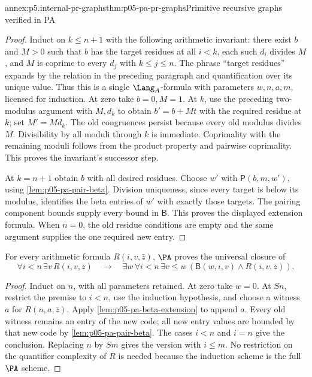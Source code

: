 \begin{annexitem}{annex:p5.internal-pr-graphs}{thm:p05-pa-pr-graphs}{Primitive recursive graphs verified in PA}
\begin{proof}
Induct on \(k\leq n+1\) with the following arithmetic invariant:
there exist \(b\) and \(M>0\) such that \(b\) has the target residues
at all \(i<k\), each such \(d_i\) divides \(M\), and \(M\) is
coprime to every \(d_j\) with \(k\leq j\leq n\).
The phrase ``target residues'' expands by the relation in the preceding
paragraph and quantification over its unique value.  Thus this is a single
\(\Lang_A\)-formula with parameters \(w,n,a,m\), licensed for induction.
At zero take \(b=0,M=1\).  At \(k\), use the preceding two-modulus
argument with \(M,d_k\) to obtain
\(b'=b+Mt\) with the required residue at \(k\); set \(M'=Md_k\).
The old congruences persist because every old modulus divides \(M\).
Divisibility by all moduli through \(k\) is immediate.  Coprimality with
the remaining moduli follows from the product property and pairwise
coprimality.  This proves the invariant's successor step.

At \(k=n+1\) obtain \(b\) with all desired residues.  Choose \(w'\)
with \(\mathsf P(b,m,w')\), using \cref{lem:p05-pa-pair-beta}.
Division uniqueness, since every target is below its modulus, identifies
the beta entries of \(w'\) with exactly those targets.  The pairing
component bounds supply every bound in \(\mathsf B\).  This proves the
displayed extension formula.  When \(n=0\), the old residue conditions
are empty and the same argument supplies the one required new entry.
\end{proof}

\begin{annexlemma}
\label{thm:p05-pa-finite-collection}
For every arithmetic formula \(R(i,v,\bar z)\), \(\PA\) proves the
universal closure of
\[
 \forall i<n\,\exists v\,R(i,v,\bar z)
 \quad\longrightarrow\quad
 \exists w\,\forall i<n\,\exists v\leq w\,
      (\mathsf B(w,i,v)\land R(i,v,\bar z)).
\]
\end{annexlemma}
\begin{proof}
Induct on \(n\), with all parameters retained.  At zero take \(w=0\).
At \(Sn\), restrict the premise to \(i<n\), use the induction
hypothesis, and choose a witness \(a\) for \(R(n,a,\bar z)\).
Apply \cref{lem:p05-pa-beta-extension} to append \(a\).
Every old witness remains an entry of the new code; all new entry values
are bounded by that new code by \cref{lem:p05-pa-pair-beta}.
The cases \(i<n\) and \(i=n\) give the conclusion.  Replacing \(n\)
by \(Sm\) gives the version with \(i\leq m\).  No restriction on the
quantifier complexity of \(R\) is needed because the induction scheme is
the full \(\PA\) scheme.
\end{proof}


\end{annexitem}
